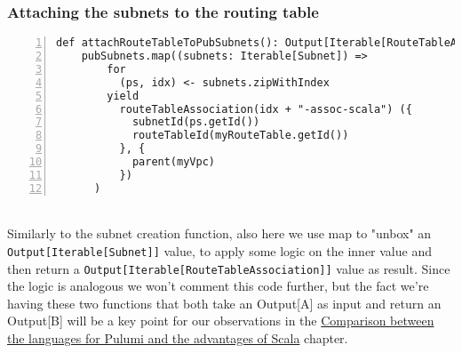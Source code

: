 \subsubsection{Attaching the subnets to the routing table}
\begin{lstlisting}[numbers=left, numberstyle=\tiny, numbersep=-5pt, stepnumber=1]
  def attachRouteTableToPubSubnets(): Output[Iterable[RouteTableAssociation]] =
    pubSubnets.map((subnets: Iterable[Subnet]) =>
        for
          (ps, idx) <- subnets.zipWithIndex
        yield
          routeTableAssociation(idx + "-assoc-scala") ({
            subnetId(ps.getId())
            routeTableId(myRouteTable.getId())
          }, {
            parent(myVpc)
          })
      )
\end{lstlisting}\mbox{}\\
Similarly to the subnet creation function, also here we use map to "unbox" an \texttt{Output[Iterable[Subnet]]} value, to apply some logic on the inner value and then return a \texttt{Output[Iterable[RouteTableAssociation]]} value as result.
Since the logic is analogous we won't comment this code further, but the fact we're having these two functions that both take an Output[A] as input and return an Output[B] will be a key point for our observations in the \hyperref[cap:comparisons]{Comparison between the languages for Pulumi and the advantages of Scala} chapter.

